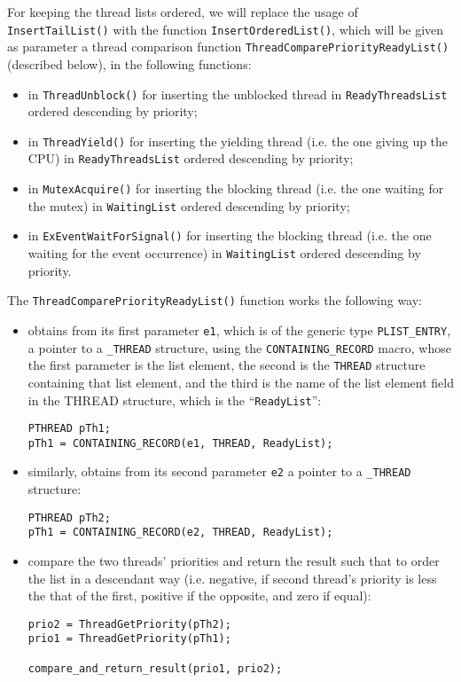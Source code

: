 For keeping the thread lists ordered, we will replace the usage of \lstinline|InsertTailList()| with the function \lstinline|InsertOrderedList()|, which will be given as parameter a thread comparison function \lstinline|ThreadComparePriorityReadyList()| (described below), in the following functions:
\begin{itemize}
    \item in \lstinline|ThreadUnblock()| for inserting the unblocked thread in \lstinline|ReadyThreadsList| ordered descending by priority;
    
    \item in \lstinline|ThreadYield()| for inserting the yielding thread (i.e. the one giving up the CPU) in \lstinline|ReadyThreadsList| ordered descending by priority;
    
    \item in \lstinline|MutexAcquire()| for inserting the blocking thread (i.e. the one waiting for the mutex) in \lstinline|WaitingList| ordered descending by priority;
    
    \item in \lstinline|ExEventWaitForSignal()| for inserting the blocking thread (i.e. the one waiting for the event occurrence) in \lstinline|WaitingList| ordered descending by priority.
\end{itemize}

The \lstinline|ThreadComparePriorityReadyList()| function works the following way:
\begin{itemize}
    \item obtains from its first parameter \lstinline|e1|, which is of the generic type \lstinline|PLIST_ENTRY|, a pointer to a \lstinline|_THREAD| structure, using the \lstinline|CONTAINING_RECORD| macro, whose the first parameter is the list element, the second is the \lstinline|THREAD| structure containing that  list element, and the third is the name of the list element field in the THREAD structure, which is the ``\lstinline|ReadyList|'':
    \begin{lstlisting}
PTHREAD pTh1;    
pTh1 = CONTAINING_RECORD(e1, THREAD, ReadyList);
    \end{lstlisting}

    \item similarly, obtains from its second parameter \lstinline|e2| a pointer to a \lstinline|_THREAD| structure:
    \begin{lstlisting}
PTHREAD pTh2;    
pTh1 = CONTAINING_RECORD(e2, THREAD, ReadyList);
    \end{lstlisting}
    
    \item compare the two threads' priorities and return the result such that to order the list in a descendant way (i.e. negative, if second thread's priority is less the that of the first, positive if the opposite, and zero if equal):
    \begin{lstlisting}
prio2 = ThreadGetPriority(pTh2);
prio1 = ThreadGetPriority(pTh1);

compare_and_return_result(prio1, prio2);
    \end{lstlisting}
\end{itemize}

